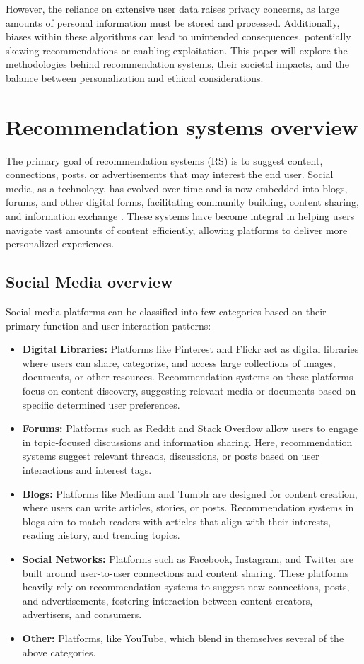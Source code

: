 \documentclass[10pt,twocolumn,twoside,a4paper]{report} %
\begin{document}
However, the reliance on extensive user data raises privacy concerns, as large amounts of personal information must
be stored and processed. Additionally, biases within these algorithms can lead to unintended consequences, potentially
skewing recommendations or enabling exploitation. This paper will explore the methodologies behind recommendation systems,
their societal impacts, and the balance between personalization and ethical considerations.

\section{Recommendation systems overview} \label{rec_sys_overview}
The primary goal of recommendation systems (RS) is to suggest content, connections, posts, or advertisements that may interest the end user.
Social media, as a technology, has evolved over time and is now embedded into blogs, forums, and other digital forms,
facilitating community building, content sharing, and information exchange \cite{anandhan2018social}.
These systems have become integral in helping users navigate vast amounts of content efficiently, allowing platforms to deliver more personalized experiences.

\subsection{Social Media overview}
Social media platforms can be classified into few categories \cite{anandhan2018social} based on their primary function and user interaction patterns:
\begin{itemize}
	\item \textbf{Digital Libraries:} Platforms like Pinterest and Flickr act as digital libraries where users can share, categorize, and access large collections of images, documents, or other resources. Recommendation systems on these platforms focus on content discovery, suggesting relevant media or documents based on specific determined user preferences.
    \item \textbf{Forums:} Platforms such as Reddit and Stack Overflow allow users to engage in topic-focused discussions and information sharing. Here, recommendation systems suggest relevant threads, discussions, or posts based on user interactions and interest tags.
    \item \textbf{Blogs:} Platforms like Medium and Tumblr are designed for content creation, where users can write articles, stories, or posts. Recommendation systems in blogs aim to match readers with articles that align with their interests, reading history, and trending topics.
    \item \textbf{Social Networks:} Platforms such as Facebook, Instagram, and Twitter are built around user-to-user connections and content sharing. These platforms heavily rely on recommendation systems to suggest new connections, posts, and advertisements, fostering interaction between content creators, advertisers, and consumers.
    \item \textbf{Other:} Platforms, like YouTube, which blend in themselves several of the above categories.
\end{itemize}
\end{document}
